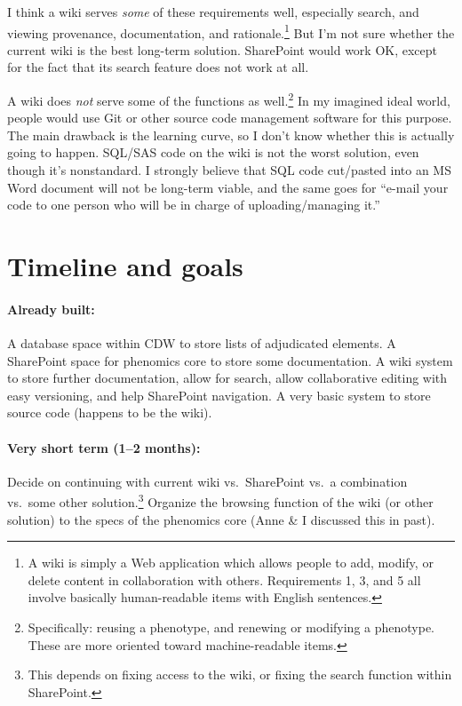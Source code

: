 \documentclass{tufte-handout}
\begin{document}
I think a wiki serves \emph{some} of these requirements
well, especially search, and viewing provenance, documentation, and
rationale.\footnote{A wiki is simply a Web application which allows
  people to add, modify, or delete content in collaboration with
  others. Requirements 1, 3, and 5 all involve basically
  human-readable items with English sentences.} But I'm not sure
whether the current wiki is the best long-term solution. SharePoint
would work OK, except for the fact that its search feature does not
work at all.

A wiki does \emph{not} serve some of the functions as
well.\footnote{Specifically: reusing a phenotype, and renewing or modifying
a phenotype. These are more oriented toward machine-readable items.}
In my imagined ideal world, people would use Git or other source code
management software for this purpose. The main drawback is the
learning curve, so I don't know whether this is actually going to
happen. SQL/SAS code on the wiki is not the worst solution, even
though it's nonstandard. I strongly believe that SQL code cut/pasted
into an MS Word document will not be long-term viable, and the same
goes for ``e-mail your code to one person who will be in charge of
uploading/managing it.''


\section{Timeline and goals}

\paragraph{Already built:}
A database space within CDW to store lists of adjudicated elements. A
SharePoint space for phenomics core to store some documentation. A
wiki system to store further documentation, allow for search, allow
collaborative editing with easy versioning, and help SharePoint
navigation. A very basic system to store source code (happens to be
the wiki).

\paragraph{Very short term (1--2 months):}
Decide on continuing with current wiki vs.\ SharePoint vs.\ a combination vs.\ some other
solution.\footnote{This depends on fixing access to the wiki, or
  fixing the search function within SharePoint.} Organize the browsing
function of the wiki (or other solution) to the specs of the phenomics
core (Anne \& I discussed this in past).
\end{document}
